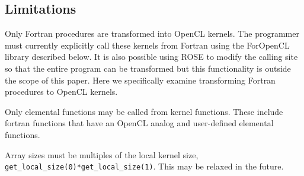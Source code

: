 \subsection{Limitations}

Only Fortran procedures are transformed into OpenCL kernels.  The programmer
must currently explicitly call these kernels from Fortran using the ForOpenCL
library described below.  It is also possible using ROSE to modify the calling
site so that the entire program can be transformed but this functionality is
outside the scope of this paper.  Here we specifically examine transforming
Fortran procedures to OpenCL kernels.

Only elemental functions may be called from kernel functions.  These include
fortran functions that have an OpenCL analog and user-defined elemental functions.

Array sizes must be multiples of the local kernel size,
{\tt get\_local\_size(0)*get\_local\_size(1)}.  This may be relaxed in the future.

